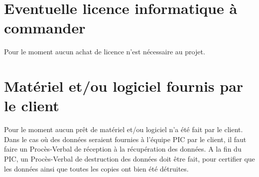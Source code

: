 \section{Eventuelle licence informatique à commander}
\label{Eventuelle licence informatique à commander}
\indent Pour le moment aucun achat de licence n'est nécessaire au projet.

\section{Matériel et/ou logiciel fournis par le client}
\label{Matériel et/ou logiciel fournis par le client}
\indent Pour le moment aucun prêt de matériel et/ou logiciel n'a été fait par le client.
\indent Dans le cas où des données seraient fournies à l’équipe PIC par le client, il faut faire un Procès-Verbal de réception à la récupération des données. A la fin du PIC, un Procès-Verbal de destruction des données doit être fait, pour certifier que les données ainsi que toutes les copies ont bien été détruites.


